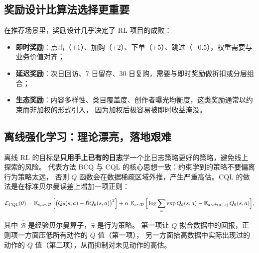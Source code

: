 \subsection{奖励设计比算法选择更重要}

在推荐场景里，奖励设计几乎决定了 RL 项目的成败：

\begin{itemize}
  \item \textbf{即时奖励}：点击（$+1$）、加购（$+2$）、下单（$+5$）、跳过（$-0.5$），权重需要与业务价值对齐；
  \item \textbf{延迟奖励}：次日回访、7 日留存、30 日复购，需要与即时奖励做折扣或分层组合；
  \item \textbf{生态奖励}：内容多样性、类目覆盖度、创作者曝光均衡度，这类奖励通常以约束而非加权的形式引入，
        因为加权后极容易被即时收益淹没。
\end{itemize}

\subsection{离线强化学习：理论漂亮，落地艰难}

离线 RL 的目标是\textbf{只用手上已有的日志}学一个比日志策略更好的策略，避免线上探索的风险。
代表方法 BCQ 与 CQL 的核心思想一致：约束学到的策略不要偏离行为策略太远，
否则 $Q$ 函数会在数据稀疏区域外推，产生严重高估。CQL 的做法是在标准贝尔曼误差上增加一项正则：

\begin{equation}
\mathcal{L}_{\text{CQL}}(\theta)
= \operatorname{\mathbb{E}}_{s,a \sim \mathcal{D}}\Big[ \big( Q_\theta(s,a) - \hat{\mathcal{B}} Q_\theta(s,a) \big)^2 \Big]
+ \alpha \, \operatorname{\mathbb{E}}_{s \sim \mathcal{D}}\Big[ \log \sum_{a} \exp Q_\theta(s,a)
- \operatorname{\mathbb{E}}_{a \sim \hat{\pi}(a \,\vert\, s)} Q_\theta(s,a) \Big],
\label{eq:cql}
\end{equation}

其中 $\hat{\mathcal{B}}$ 是经验贝尔曼算子，$\hat{\pi}$ 是行为策略。
第一项让 $Q$ 拟合数据中的回报，正则项一方面压低所有动作的 $Q$ 值（第一项），
另一方面抬高数据中实际出现过的动作的 $Q$ 值（第二项），从而抑制对未见动作的高估。

